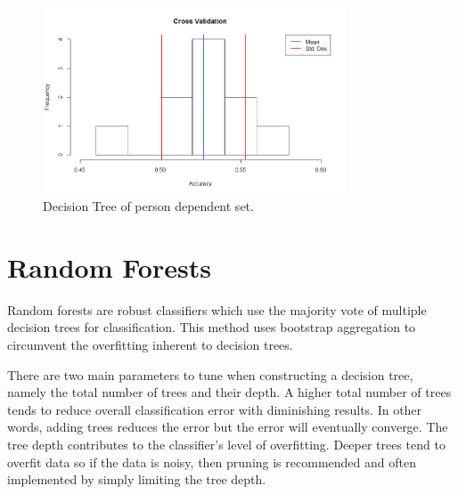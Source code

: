 \documentclass[paper=a4, fontsize=11pt]{scrartcl} %
\begin{document}
\begin{figure}[h]
	\centering
	\includegraphics[width=0.8\textwidth]{figures/crossValidation.png}
	\caption{Decision Tree of person dependent set.}
	\label{fig:scree}
\end{figure}


\clearpage
\section{Random Forests}
Random forests are robust classifiers which use the majority vote of multiple decision trees for classification. This method uses bootstrap aggregation to circumvent the overfitting inherent to decision trees.\par
There are two main parameters to tune when constructing a decision tree, namely the total number of trees and their depth. A higher total number of trees tends to reduce overall classification error with diminishing results. In other words, adding trees reduces the error but the error will eventually converge. The tree depth contributes to the classifier's level of overfitting. Deeper trees tend to overfit data so if the data is noisy, then pruning is recommended and often implemented by simply limiting the tree depth. 
\end{document}
